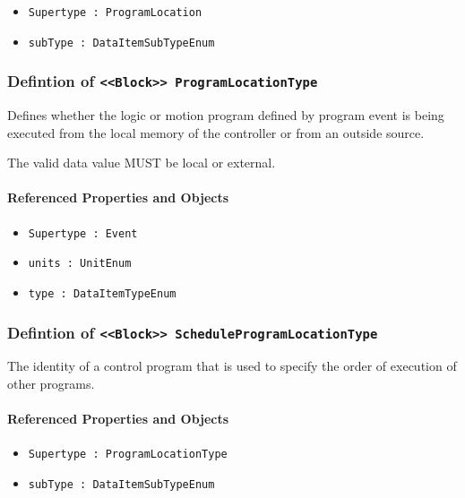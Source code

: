\begin{itemize}
\item \texttt{Supertype : ProgramLocation}

\item \texttt{subType : DataItemSubTypeEnum}

\end{itemize}
\FloatBarrier
\subsubsection{Defintion of \texttt{<<Block>> ProgramLocationType}}
  \label{type:ProgramLocationType}

\FloatBarrier

Defines whether the logic or motion program defined by program event is being executed from the local memory of the controller or from an outside source.
  
 The valid data value MUST be local or external.

\FloatBarrier
\paragraph{Referenced Properties and Objects}

\begin{itemize}
\item \texttt{Supertype : Event}

\item \texttt{units : UnitEnum}

\item \texttt{type : DataItemTypeEnum}

\end{itemize}
\FloatBarrier
\subsubsection{Defintion of \texttt{<<Block>> ScheduleProgramLocationType}}
  \label{type:ScheduleProgramLocationType}

\FloatBarrier

The identity of a control program that is used to specify the order of execution of other programs.

\FloatBarrier
\paragraph{Referenced Properties and Objects}

\begin{itemize}
\item \texttt{Supertype : ProgramLocationType}

\item \texttt{subType : DataItemSubTypeEnum}

\end{itemize}
\FloatBarrier
